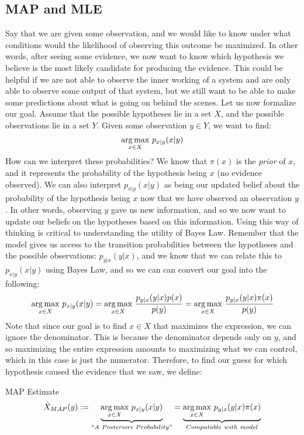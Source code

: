   
\subsection{MAP and MLE}
Say that we are given some observation, and we would like to know under what conditions would the likelihood of observing this outcome be maximized. In other words, after seeing some evidence, we now want to know which hypothesis we believe is the most likely candidate for producing the evidence. This could be helpful if we are not able to observe the inner working of a system and are only able to observe some output of that system, but we still want to be able to make some predictions about what is going on behind the scenes. Let us now formalize our goal. Assume that the possible hypotheses lie in a set \(X\), and the possible observations lie in a set \(Y\). Given some observation \(y \in Y\), we want to find:
\begin{equation*}
  \underset{x \in X}{\operatorname*{arg\,max}}\ p_{x|y}(x|y)
\end{equation*}
How can we interpret these probabilities? We know that \(\pi(x)\) is the \textit{prior} of \(x\), and it represents the probability of the hypothesis being \(x\) (no evidence observed). We can also interpret \(p_{x|y}(x|y)\) as being our updated belief about the probability of the hypothesis being \(x\) now that we have observed an observation \(y\). In other words, observing \(y\) gave us new information, and so we now want to update our beliefs on the hypotheses based on this information. Using this way of thinking is critical to understanding the utility of Bayes Law. Remember that the model gives us access to the transition probabilities between the hypotheses and the possible observations: \(p_{y|x}(y|x)\), and we know that we can relate this to \(p_{x|y}(x|y)\) using Bayes Law, and so we can can convert our goal into the following:
\begin{equation*}
  \underset{x\in X}{\operatorname*{arg\,max}}\ p_{x|y}(x|y) = \underset{x \in X}{\operatorname*{arg\,max}}\ \frac{p_{y|x}(y|x)p(x)}{p(y)} = \underset{x\in X}{\operatorname*{arg\,max}}\  \frac{p_{y|x}(y|x)\pi(x)}{p(y)}
\end{equation*}
Note that since our goal is to find \(x\in X\) that maximizes the expression, we can ignore the denominator. This is because the denominator depends only on \(y\), and so maximizing the entire expression amounts to maximizing what we can control, which in this case is just the numerator. Therefore, to find our guess for which hypothesis caused the evidence that we saw, we define:
\begin{defn}{MAP Estimate}{}
\begin{equation*}
  \MAP (y) := \underbrace{\underset{x \in X}{\argmax}\ p_{x|y}(x|y)}_{``A\ Posteriori \ Probability"} = \underbrace{\underset{x\in X}{\argmax}\ p_{y|x}(y|x)\pi(x)}_{Computable \ with \ model}
\end{equation*}
\end{defn}

